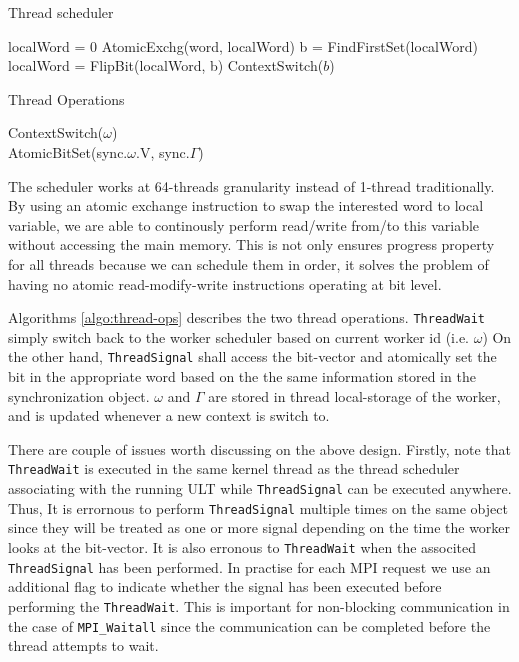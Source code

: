 \begin{algorithm}
  \caption{Thread scheduler}
  \label{algo:thread}
  \begin{algorithmic}[1]
     
     
        \State localWord = 0
        \State AtomicExchg(word, localWord)
          \State b = FindFirstSet(localWord)
          \State localWord = FlipBit(localWord, b)
          \State ContextSwitch($b$)
        \EndWhile
      \EndIf
      \EndFor
    \EndWhile
    \EndProcedure
  \end{algorithmic}
\end{algorithm}

\begin{algorithm}
  \caption{Thread Operations}
  \label{algo:thread-ops}
  \begin{algorithmic}[1]
      \State ContextSwitch($\omega$)
    \EndProcedure
    \\ 
      \State AtomicBitSet(sync.$\omega$.V, sync.$\Gamma$)
    \EndProcedure
  \end{algorithmic}
\end{algorithm}

The scheduler works at 64-threads granularity instead of 1-thread traditionally.
By using an atomic exchange instruction to swap the interested word to local variable, we
are able to continously perform read/write from/to this variable without
accessing the main memory. This is not only ensures progress property for all
threads because we can schedule them in order, it solves the problem of having
no atomic read-modify-write instructions operating at bit level.

Algorithms \ref{algo:thread-ops} describes the two thread operations.
\texttt{ThreadWait} simply switch back to the worker scheduler based on current
worker id (i.e. $\omega$) On the other hand, \texttt{ThreadSignal} shall access
the bit-vector and atomically set the bit in the appropriate word based on the
the same information stored in the synchronization object. $\omega$ and
$\Gamma$ are stored in thread local-storage of the worker, and is updated
whenever a new context is switch to.

There are couple of issues worth discussing on the above design.  Firstly, note
that \texttt{ThreadWait} is executed in the same kernel thread as the thread
scheduler associating with the running ULT while \texttt{ThreadSignal} can be
executed anywhere. Thus, It is errornous to perform \texttt{ThreadSignal}
multiple times on the same object since they will be treated as one or more
signal depending on the time the worker looks at the bit-vector. It is also
erronous to \texttt{ThreadWait} when the associted \texttt{ThreadSignal} has
been performed. In practise for each MPI request we use an additional flag to
indicate whether the signal has been executed before performing the
\texttt{ThreadWait}. This is important for non-blocking communication in the
case of \texttt{MPI_Waitall} since the communication can be completed before
the thread attempts to wait.

